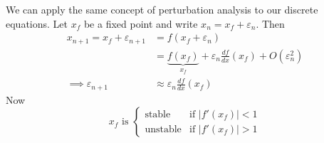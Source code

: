 \documentclass{../../template/note}
\begin{document}
    We can apply the same concept of perturbation analysis to our discrete equations. Let \(x_f\) be a fixed point and write \(x_n = x_f + \varepsilon_n\). Then
    \begin{align*}
        x_{n+1} = x_f + \varepsilon_{n+1} &= f(x_f + \varepsilon_n) \\
        &= \underbrace{f(x_f)}_{x_f} + \varepsilon_n \frac{df}{dx}(x_f) + O(\varepsilon_n^2) \\
        \implies \varepsilon_{n+1} &\approx \varepsilon_n \frac{df}{dx}(x_f)
    \end{align*}
    Now
    \[
        x_f \text{ is } \begin{cases}
            \text{stable} & \text{if } |f'(x_f)| < 1 \\
            \text{unstable} & \text{if } |f'(x_f)| > 1
        \end{cases}
    \]
    
\end{document}
